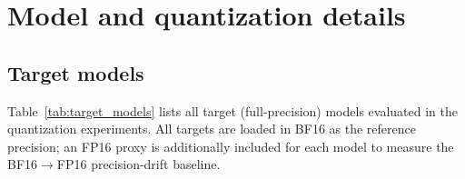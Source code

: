 
\section{Model and quantization details}
\label{app:model_details}

\subsection{Target models}

Table~\ref{tab:target_models} lists all target (full-precision) models evaluated in the quantization experiments.
All targets are loaded in BF16 as the reference precision; an FP16 proxy is additionally included for each model to measure the BF16$\to$FP16 precision-drift baseline.

